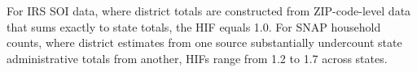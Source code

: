 For IRS SOI data, where district totals are constructed from ZIP-code-level data that sums exactly to state totals, the HIF equals 1.0. For SNAP household counts, where district estimates from one source substantially undercount state administrative totals from another, HIFs range from 1.2 to 1.7 across states.
